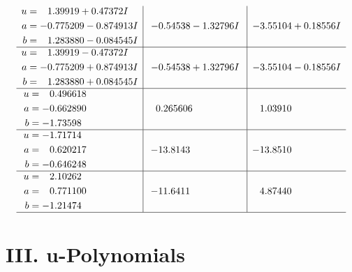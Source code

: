 \documentclass[1p]{elsarticle_modified}
\theoremstyle{definition}
\begin{document}
$$\begin{array}{c|c|c}
\begin{aligned}
u &= \phantom{-}1.39919 + 0.47372 I \\
a &= -0.775209 - 0.874913 I \\
b &= \phantom{-}1.283880 - 0.084545 I\end{aligned}
 & -0.54538 - 1.32796 I & -3.55104 + 0.18556 I \\ \hline\begin{aligned}
u &= \phantom{-}1.39919 - 0.47372 I \\
a &= -0.775209 + 0.874913 I \\
b &= \phantom{-}1.283880 + 0.084545 I\end{aligned}
 & -0.54538 + 1.32796 I & -3.55104 - 0.18556 I \\ \hline\begin{aligned}
u &= \phantom{-}0.496618\phantom{ +0.000000I} \\
a &= -0.662890\phantom{ +0.000000I} \\
b &= -1.73598\phantom{ +0.000000I}\end{aligned}
 & \phantom{-}0.265606\phantom{ +0.000000I} & \phantom{-}1.03910\phantom{ +0.000000I} \\ \hline\begin{aligned}
u &= -1.71714\phantom{ +0.000000I} \\
a &= \phantom{-}0.620217\phantom{ +0.000000I} \\
b &= -0.646248\phantom{ +0.000000I}\end{aligned}
 & -13.8143\phantom{ +0.000000I} & -13.8510\phantom{ +0.000000I} \\ \hline\begin{aligned}
u &= \phantom{-}2.10262\phantom{ +0.000000I} \\
a &= \phantom{-}0.771100\phantom{ +0.000000I} \\
b &= -1.21474\phantom{ +0.000000I}\end{aligned}
 & -11.6411\phantom{ +0.000000I} & \phantom{-}4.87440\phantom{ +0.000000I}\\
 \hline 
 \end{array}$$\newpage
\newpage\renewcommand{\arraystretch}{1}
\centering \section*{ III. u-Polynomials}
\end{document}

